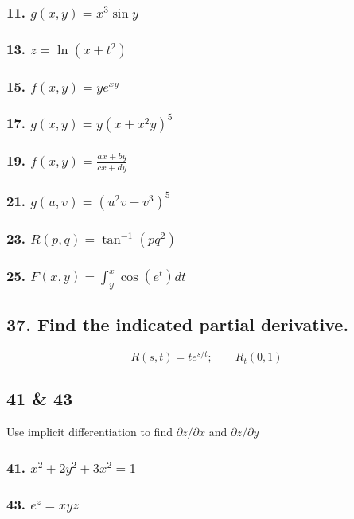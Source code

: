 \documentclass{article}
\begin{document}
\subsubsection*{11. $g(x,y) = x^3 \sin y$}
\subsubsection*{13. $z = \ln (x + t^2)$}
\subsubsection*{15. $f(x,y) = ye^{xy}$}
\subsubsection*{17. $g(x,y) = y(x + x^2 y)^5$}
\subsubsection*{19. $f(x,y) = \displaystyle\frac{ax + by}{cx + dy}$}
\subsubsection*{21. $g(u, v) = (u^2v-v^3)^5$}
\subsubsection*{23. $R(p, q) = \tan^{-1} (pq^2)$}
\subsubsection*{25. $F(x,y) = \int_y^x \cos (e^t) dt$}
\subsection*{37. Find the indicated partial derivative.}
\[
    R(s,t) = te^{s/t}; \qquad R_t (0,1)
\]
\subsection*{41 \& 43}
Use implicit differentiation to find $\partial z / \partial x$ and $\partial z / \partial y$
\subsubsection*{41. $x^2 + 2y^2 + 3x^2 = 1$}
\subsubsection*{43. $e^z = xyz$}
\end{document}
